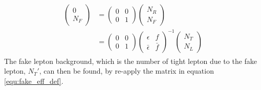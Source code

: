 \begin{align}
\begin{split}
\left( \begin{array}{c}
0 \\
N_F
\end{array} \right)
&=
\left( \begin{array}{cc}
0 & 0 \\
0 & 1
\end{array} \right)
\left( \begin{array}{c}
N_R \\
N_F
\end{array} \right) \\
&=
\left( \begin{array}{cc}
0 & 0 \\
0 & 1
\end{array} \right)
\left( \begin{array}{cc}
\epsilon & f \\
\bar{\epsilon} & \bar{f}
\end{array} \right)^{-1}
\left( \begin{array}{c}
N_T \\
N_L
\end{array} \right)
\end{split}
\end{align}
The fake lepton background, which is the number of tight lepton due to the fake lepton, $N_T'$, can then be found, by re-apply the matrix in equation \ref{equ:fake_eff_def}.
